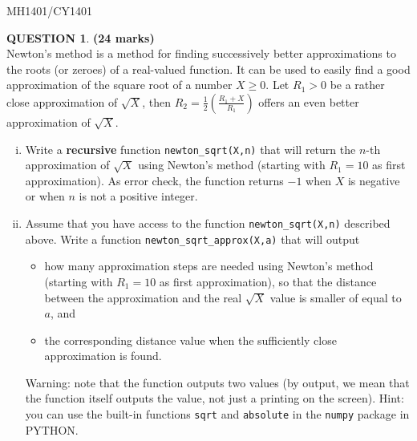 \documentclass[a4paper,12pt]{article}
\theoremstyle{definition}
\newtheorem{ques}[dummy]{QUESTION}
\theoremstyle{plain}
\newcommand{\ttx}[1]{\texttt{#1}}
\newcommand{\bigbracket}[1]{\left( #1 \right)}
\begin{document}
\newpage

\hfill MH1401/CY1401\vspace*{0.5em}

\begin{ques}\hfill \textbf{(24 marks)}\vspace*{2em}\\
	Newton's method is a method for finding successively better approximations to the roots (or zeroes) of a real-valued function. It can be used to easily find a good approximation of the square root of a number $X\geq 0$. Let $R_1 > 0$ be a rather close approximation of $\sqrt{X}$, then $R_2 = \frac{1}{2}\bigbracket{\frac{R_1+X}{R_1}}$ offers an even better approximation of $\sqrt{X}$.
	
	\begin{enumerate}[(i)]
		\item Write a \textbf{recursive} function \ttx{newton\_sqrt(X,n)} that will return the $n$-th approximation of $\sqrt{X}$ using Newton's method (starting with $R_1 = 10$ as first approximation). As error check, the function returns $-1$ when $X$ is negative or when $n$ is not a positive integer.
		
		\item Assume that you have access to the function \ttx{newton\_sqrt(X,n)} described above. Write a function \ttx{newton\_sqrt\_approx(X,a)} that will output
		\begin{itemize}
			\item how many approximation steps are needed using Newton's method (starting with $R_1 = 10$ as first approximation), so that the distance between the approximation and the real $\sqrt{X}$ value is smaller of equal to $a$, and
			\item the corresponding distance value when the sufficiently close approximation is found.
		\end{itemize}
		Warning: note that the function outputs two values (by output, we mean that the function itself outputs the value, not just a printing on the screen). Hint: you can use the built-in functions \ttx{sqrt} and \ttx{absolute} in the \ttx{numpy} package in PYTHON.
	\end{enumerate}
\end{ques}
\end{document}
